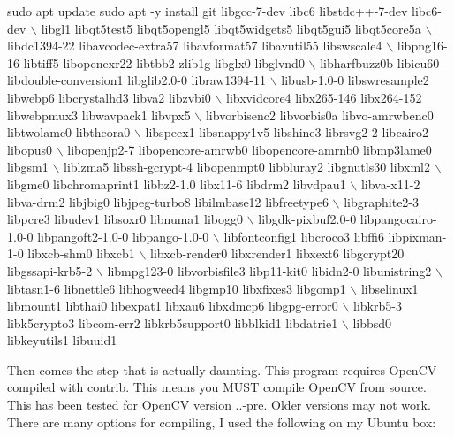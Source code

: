 \begin{DoxyCode}
sudo apt update
sudo apt -y install git libgcc-7-dev libc6 libstdc++-7-dev libc6-dev \(\backslash\)
libgl1 libqt5test5 libqt5opengl5 libqt5widgets5 libqt5gui5 libqt5core5a \(\backslash\)
libdc1394-22 libavcodec-extra57 libavformat57 libavutil55 libswscale4 \(\backslash\)
libpng16-16 libtiff5 libopenexr22 libtbb2 zlib1g libglx0 libglvnd0 \(\backslash\)
libharfbuzz0b libicu60 libdouble-conversion1 libglib2.0-0 libraw1394-11 \(\backslash\)
libusb-1.0-0 libswresample2 libwebp6 libcrystalhd3 libva2 libzvbi0 \(\backslash\)
libxvidcore4 libx265-146 libx264-152 libwebpmux3 libwavpack1 libvpx5 \(\backslash\)
libvorbisenc2 libvorbis0a libvo-amrwbenc0 libtwolame0 libtheora0 \(\backslash\)
libspeex1 libsnappy1v5 libshine3 librsvg2-2 libcairo2 libopus0 \(\backslash\)
libopenjp2-7 libopencore-amrwb0 libopencore-amrnb0 libmp3lame0 libgsm1 \(\backslash\)
liblzma5 libssh-gcrypt-4 libopenmpt0 libbluray2 libgnutls30 libxml2 \(\backslash\)
libgme0 libchromaprint1 libbz2-1.0 libx11-6 libdrm2 libvdpau1 \(\backslash\)
libva-x11-2 libva-drm2 libjbig0 libjpeg-turbo8 libilmbase12 libfreetype6 \(\backslash\)
libgraphite2-3 libpcre3 libudev1 libsoxr0 libnuma1 libogg0 \(\backslash\)
libgdk-pixbuf2.0-0 libpangocairo-1.0-0 libpangoft2-1.0-0 libpango-1.0-0 \(\backslash\)
libfontconfig1 libcroco3 libffi6 libpixman-1-0 libxcb-shm0 libxcb1 \(\backslash\)
libxcb-render0 libxrender1 libxext6 libgcrypt20 libgssapi-krb5-2 \(\backslash\)
libmpg123-0 libvorbisfile3 libp11-kit0 libidn2-0 libunistring2 \(\backslash\)
libtasn1-6 libnettle6 libhogweed4 libgmp10 libxfixes3 libgomp1 \(\backslash\)
libselinux1 libmount1 libthai0 libexpat1 libxau6 libxdmcp6 libgpg-error0 \(\backslash\)
libkrb5-3 libk5crypto3 libcom-err2 libkrb5support0 libblkid1 libdatrie1 \(\backslash\)
libbsd0 libkeyutils1 libuuid1
\end{DoxyCode}


Then comes the step that is actually daunting. This program requires Open\+CV compiled with {\ttfamily contrib}. This means you M\+U\+ST compile Open\+CV from source. This has been tested for Open\+CV version {..-\/pre}. Older versions may not work. There are many options for compiling, I used the following on my Ubuntu box\+:


